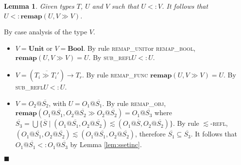 \documentclass[preprint]{sigplanconf}
\makeatletter
\newtheorem{lem}{Lemma}
\newcommand{\lemref}[1]{Lemma \ref{#1}}
\newcommand{\subrefl}{\textsc{sub\_refl}}
\newcommand{\remapunit}{\textsc{remap\_unit}}
\newcommand{\remapbool}{\textsc{remap\_bool}}
\newcommand{\remapfunc}{\textsc{remap\_func}}
\newcommand{\remapobj}{\textsc{remap\_obj}}
\newcommand{\remapapp}[3]{\ensuremath{\mathbf{remap}(#1, #2 \gg #3)}}
\newcommand{\unitt}{\mathbf{Unit}}
\newcommand{\boolt}{\mathbf{Bool}}
\newcommand{\ot}[2]{#1@\overline{#2}}
\newcommand{\funt}[3]{(\overline{#1 \gg #2}) \rightarrow #3}
\newcommand{\qed}{$\blacksquare$}
\newenvironment{proof}{\vspace{1ex}\noindent{\bf Proof}\hspace{0.5em}}
  {\hfill\qed\vspace{1ex}}
\makeatother
\begin{document}
\begin{lem}
\label{lem:remapeff}
Given types $T$, $U$ and $V$ such that $U <: V$.
It follows that $U <: \remapapp{U}{V}{V}$.
\end{lem}
\begin{proof}
By case analysis of the type $V$.

\begin{itemize}
\item $V = \unitt$ or $V = \boolt$. By rule \remapunit or \remapbool,
$\remapapp{U}{V}{V} = U$. By \subrefl $U <: U$.

\item $V = \funt{T_i}{T_i'}{T_r}$. By rule \remapfunc
$\remapapp{U}{V}{V} = U$. By \subrefl $U <: U$.

\item $V = \ot{O_2}{S_2}$, with $U = \ot{O_1}{S_1}$.
By rule \remapobj, $\remapapp{\ot{O_1}{S_1}}{\ot{O_2}{S_2}}{\ot{O_2}{S_2}} = \ot{O_1}{S_3}$ where
$\overline{S_3} = \bigcup \{ \overline{S} \mid (\ot{O_1}{S_1}, \ot{O_2}{S_2}) \lesssim (\ot{O_1}{S}, \ot{O_2}{S_2}) \}$.
By rule $\lesssim$\textsc{-refl},
$(\ot{O_1}{S_1}, \ot{O_2}{S_2}) \lesssim (\ot{O_1}{S_1}, \ot{O_2}{S_2})$,
therefore $\overline{S_1} \subseteq \overline{S_3}$. It follows that
$\ot{O_1}{S_1} <: \ot{O_1}{S_3}$ by \lemref{lem:ssetinc}.

\end{itemize}
\end{proof}

\end{document}
